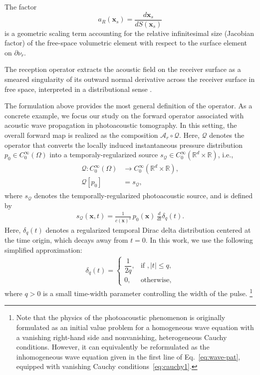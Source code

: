 \documentclass[11pt,reqno]{amsart}
\theoremstyle{remark}
\newcommand{\bx}{\boldsymbol{x}}
\begin{document}
The factor
\[
a_R(\bx_s) = \frac{d\bx_s}{dS(\bx_s)}
\]
is a geometric scaling term accounting for the relative infinitesimal size (Jacobian factor) of the free-space volumetric element with respect to the surface element on \(\partial\nu_r\).

The reception operator extracts the acoustic field on the receiver surface as a smeared singularity of its outward normal derivative across the receiver surface in free space, interpreted in a distributional sense \cite{Javaherian2022}.

The formulation above provides the most general definition of the operator. As a concrete example, we focus our study on the forward operator associated with acoustic wave propagation in photoacoustic tomography.
In this setting, the overall forward map is realized as the composition \( \mathcal{A}_r \circ \mathcal{Q} \). Here, 
\( \mathcal{Q} \) denotes the operator that converts the locally induced 
instantaneous pressure distribution \( p_0 \in C_0^\infty(\Omega) \) into a temporaly-regularized source \( s_{\mathcal{Q}} \in C_0^\infty(\mathbb{R}^d \times \mathbb{R}) \), i.e.,
\begin{align} \label{eq:photoacoustic-op}
    \begin{split}
        \mathcal{Q}: C_0^{\infty}(\Omega) &\rightarrow C_0^{\infty}(\mathbb{R}^d \times \mathbb{R}), \\
        \mathcal{Q}[p_0] &= s_{\mathcal{Q}},
    \end{split}
\end{align}
where \(s_{\mathcal{Q}}\) denotes the temporally-regularized photoacoustic source, and is defined by
\begin{align}   \label{eq:photoacoustic-source}
    s_{\mathcal{Q}}(\bx, t) = \frac{1}{c(\bx)^2}\, p_0(\bx)\, \frac{d}{d t}\delta_q(t).
\end{align}
Here, \(\delta_q(t)\) denotes a regularized temporal Dirac delta distribution centered at the time origin, which decays away from \(t=0\). In this work, we use the following simplified approximation:
\begin{align} \label{eq:dirac-t}
\delta_q(t) =
\begin{cases}
\dfrac{1}{2q}, & \text{if } , \mid t \mid  \leq q, \\
0, & \text{otherwise},
\end{cases}
\end{align}
where \(q>0\) is a small time-width parameter controlling the width of the pulse. \footnote{Note that the physics of the photoacoustic phenomenon is originally formulated as an initial value problem for a homogeneous wave equation with a vanishing right-hand side and nonvanishing, heterogeneous Cauchy conditions. However, it can equivalently be reformulated as the inhomogeneous wave equation given in the first line of Eq.~\eqref{eq:wave-pat}, equipped with vanishing Cauchy conditions~\eqref{eq:cauchy1}.}
\end{document}
